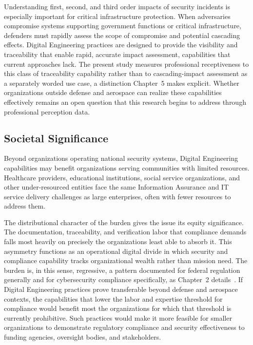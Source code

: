 Understanding first, second, and third order impacts of security incidents is especially important for critical infrastructure protection. When adversaries compromise systems supporting government functions or critical infrastructure, defenders must rapidly assess the scope of compromise and potential cascading effects. Digital Engineering practices are designed to provide the visibility and traceability that enable rapid, accurate impact assessment, capabilities that current approaches lack. The present study measures professional receptiveness to this class of traceability capability rather than to cascading-impact assessment as a separately worded use case, a distinction Chapter~5 makes explicit. Whether organizations outside defense and aerospace can realize these capabilities effectively remains an open question that this research begins to address through professional perception data.

\subsection{Societal Significance}

Beyond organizations operating national security systems, Digital Engineering capabilities may benefit organizations serving communities with limited resources. Healthcare providers, educational institutions, social service organizations, and other under-resourced entities face the same Information Assurance and IT service delivery challenges as large enterprises, often with fewer resources to address them.

The distributional character of the burden gives the issue its equity significance. The documentation, traceability, and verification labor that compliance demands falls most heavily on precisely the organizations least able to absorb it. This asymmetry functions as an operational digital divide in which security and compliance capability tracks organizational wealth rather than mission need. The burden is, in this sense, regressive, a pattern documented for federal regulation generally and for cybersecurity compliance specifically, as Chapter~2 details~\parencite{Crain_Hopkins_2001, GAO_CMMC_2026}. If Digital Engineering practices prove transferable beyond defense and aerospace contexts, the capabilities that lower the labor and expertise threshold for compliance would benefit most the organizations for which that threshold is currently prohibitive. Such practices would make it more feasible for smaller organizations to demonstrate regulatory compliance and security effectiveness to funding agencies, oversight bodies, and stakeholders.

